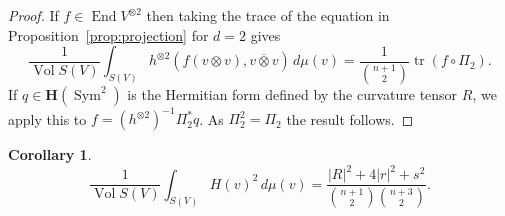 \documentclass[10pt,a4paper]{amsart}
\newtheorem{coro}[theo]{Corollary}
\theoremstyle{definition}
\def\ov#1{\overline{#1}}
\def\d{\,d}
\def\herm{\mathbf{H}}
\DeclareMathOperator{\Sym}{Sym}
\DeclareMathOperator{\tr}{tr}
\DeclareMathOperator{\Vol}{Vol}
\DeclareMathOperator{\End}{End}
\begin{document}
\begin{proof}
If $f \in \End V^{\otimes 2}$ then taking the trace of the
equation in Proposition~\ref{prop:projection} for $d = 2$ gives
$$
\frac{1}{\Vol S(V)}
\int_{S(V)}
\!\!\!
h^{\otimes 2}(f(v \otimes v), \ov{v \otimes v}) \d\mu(v)
= \frac{1}{\binom{n+1}{2}} \tr(f \circ \Pi_2).
$$
If $q \in \herm(\Sym^2)$ is the Hermitian form defined by the curvature tensor $R$,
we apply this to $f = (h^{\otimes 2})^{-1} \Pi_2^* q$.
As $\Pi_2^2 = \Pi_2$ the result follows.
\end{proof}


\begin{coro}
$$
\frac{1}{\Vol S(V)} \int_{S(V)}
\!\!\!
H(v)^2  \d\mu(v)
= \frac{|R|^2 + 4|r|^2 + s^2}{\binom{n+1}{2} \binom{n+3}2}.
$$
\end{coro}
\end{document}

